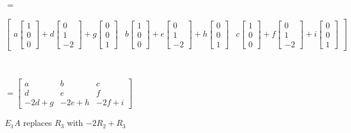 \documentclass{report}
\begin{document}
\begin{example}
$=$\begin{footnotesize}
$\begin{bmatrix}
	a\begin{bmatrix} 1 \\ 0 \\ 0 \end{bmatrix} +d\begin{bmatrix} 0 \\ 1 \\ -2 \end{bmatrix} + g\begin{bmatrix} 0 \\ 0 \\ 1 \end{bmatrix} & b\begin{bmatrix} 1 \\ 0 \\ 0 \end{bmatrix} + e\begin{bmatrix} 0 \\ 1 \\ -2 \end{bmatrix} + h\begin{bmatrix} 0 \\ 0 \\ 1 \end{bmatrix} & c\begin{bmatrix} 1 \\ 0 \\ 0 \end{bmatrix} + f\begin{bmatrix} 0 \\ 1 \\ -2 \end{bmatrix} + i\begin{bmatrix} 0 \\ 0 \\ 1 \end{bmatrix}
\end{bmatrix}$
\end{footnotesize}\\\vspace{2mm}

$=\begin{bmatrix}
	a & b & c \\
	d & e & f \\
	-2d+g & -2e+h & -2f+i
\end{bmatrix}$

\begin{center}
$E_1A$ replaces $R_3$ with $-2R_2+R_3$	
\end{center}
\end{example}
\end{document}
